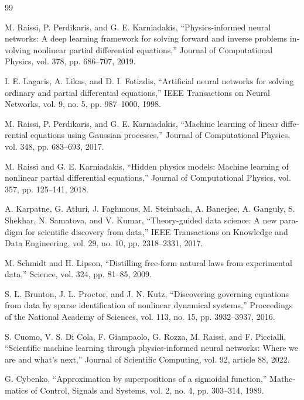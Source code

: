 \begin{singlespace}
\begin{latin}
\begin{thebibliography}{99}
\setlength{\itemsep}{2pt}

M. Raissi, P. Perdikaris, and G. E. Karniadakis, “Physics-informed neural
networks: A deep learning framework for solving forward and inverse problems
involving nonlinear partial differential equations,” Journal of Computational
Physics, vol. 378, pp. 686–707, 2019.

I. E. Lagaris, A. Likas, and D. I. Fotiadis, “Artificial neural networks for
solving ordinary and partial differential equations,” IEEE Transactions on
Neural Networks, vol. 9, no. 5, pp. 987–1000, 1998.

M. Raissi, P. Perdikaris, and G. E. Karniadakis, “Machine learning of linear
differential equations using Gaussian processes,” Journal of Computational
Physics, vol. 348, pp. 683–693, 2017.

M. Raissi and G. E. Karniadakis, “Hidden physics models: Machine learning of
nonlinear partial differential equations,” Journal of Computational Physics,
vol. 357, pp. 125–141, 2018.

A. Karpatne, G. Atluri, J. Faghmous, M. Steinbach, A. Banerjee, A. Ganguly,
S. Shekhar, N. Samatova, and V. Kumar, “Theory-guided data science: A new
paradigm for scientific discovery from data,” IEEE Transactions on Knowledge
and Data Engineering, vol. 29, no. 10, pp. 2318–2331, 2017.

M. Schmidt and H. Lipson, “Distilling free-form natural laws from experimental
data,” Science, vol. 324, pp. 81–85, 2009.

S. L. Brunton, J. L. Proctor, and J. N. Kutz, “Discovering governing equations
from data by sparse identification of nonlinear dynamical systems,” Proceedings
of the National Academy of Sciences, vol. 113, no. 15, pp. 3932–3937, 2016.

S. Cuomo, V. S. Di Cola, F. Giampaolo, G. Rozza, M. Raissi, and F. Piccialli,
“Scientific machine learning through physics-informed neural networks: Where
we are and what’s next,” Journal of Scientific Computing, vol. 92, article 88,
2022.

G. Cybenko, “Approximation by superpositions of a sigmoidal function,”
Mathematics of Control, Signals and Systems, vol. 2, no. 4, pp. 303–314, 1989.


\end{thebibliography}
\end{latin}
\end{singlespace}
